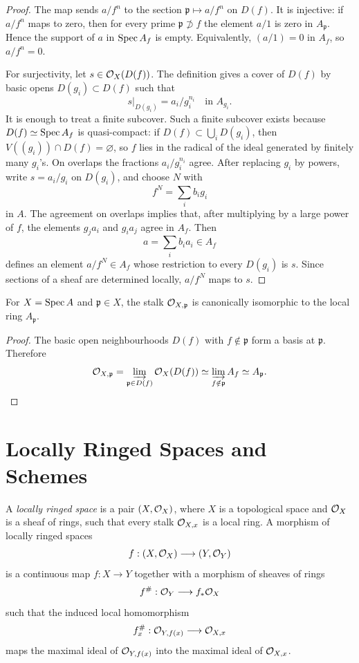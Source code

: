 \begin{proof}
The map sends \(a/f^n\) to the section \(\mathfrak p\mapsto a/f^n\) on
\(D(f)\).  It is injective: if \(a/f^n\) maps to zero, then for every prime
\(\mathfrak p\not\supset f\) the element \(a/1\) is zero in \(A_{\mathfrak p}\).
Hence the support of \(a\) in \(\operatorname{Spec} A_f\) is empty.  Equivalently,
\((a/1)=0\) in \(A_f\), so \(a/f^n=0\).

For surjectivity, let \(s\in\mathcal{O}_X(D(f))\).  The definition gives a cover of
\(D(f)\) by basic opens \(D(g_i)\subset D(f)\) such that
\[
    s|_{D(g_i)}=a_i/g_i^{n_i}
    \quad\text{in } A_{g_i}.
\]
It is enough to treat a finite subcover.  Such a finite subcover exists because
\(D(f)\simeq\operatorname{Spec} A_f\) is quasi-compact: if \(D(f)\subset\bigcup_iD(g_i)\),
then \(V((g_i))\cap D(f)=\varnothing\), so \(f\) lies in the radical of the
ideal generated by finitely many \(g_i\)'s.  On overlaps the fractions
\(a_i/g_i^{n_i}\) agree.  After replacing \(g_i\) by powers, write
\(s=a_i/g_i\) on \(D(g_i)\), and choose \(N\) with
\[
    f^N=\sum_i b_i g_i
\]
in \(A\).  The agreement on overlaps implies that, after multiplying by a
large power of \(f\), the elements \(g_j a_i\) and \(g_i a_j\) agree in
\(A_f\).  Then
\[
    a=\sum_i b_i a_i\in A_f
\]
defines an element \(a/f^N\in A_f\) whose restriction to every \(D(g_i)\) is
\(s\).  Since sections of a sheaf are determined locally, \(a/f^N\) maps to
\(s\).
\end{proof}

\begin{corollary}
For \(X=\operatorname{Spec} A\) and \(\mathfrak p\in X\), the stalk \(\mathcal{O}_{X,\mathfrak p}\)
is canonically isomorphic to the local ring \(A_{\mathfrak p}\).
\end{corollary}

\begin{proof}
The basic open neighbourhoods \(D(f)\) with \(f\notin\mathfrak p\) form a basis
at \(\mathfrak p\).  Therefore
\[
    \mathcal{O}_{X,\mathfrak p}
    =\varinjlim_{\mathfrak p\in D(f)}\mathcal{O}_X(D(f))
    \simeq \varinjlim_{f\notin\mathfrak p} A_f
    \simeq A_{\mathfrak p}.
\]
\end{proof}

\section{Locally Ringed Spaces and Schemes}

\begin{definition}
A \emph{locally ringed space} is a pair \((X,\mathcal{O}_X)\), where \(X\) is a
topological space and \(\mathcal{O}_X\) is a sheaf of rings, such that every stalk
\(\mathcal{O}_{X,x}\) is a local ring.  A morphism of locally ringed spaces
\[
    f:(X,\mathcal{O}_X)\longrightarrow (Y,\mathcal{O}_Y)
\]
is a continuous map \(f:X\to Y\) together with a morphism of sheaves of rings
\[
    f^\#:\mathcal{O}_Y\longrightarrow f_*\mathcal{O}_X
\]
such that the induced local homomorphism
\[
    f^\#_x:\mathcal{O}_{Y,f(x)}\longrightarrow \mathcal{O}_{X,x}
\]
maps the maximal ideal of \(\mathcal{O}_{Y,f(x)}\) into the maximal ideal of
\(\mathcal{O}_{X,x}\).
\end{definition}

